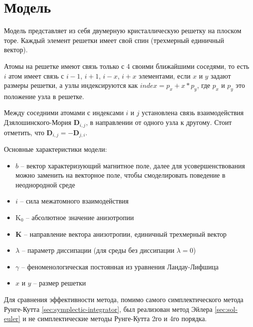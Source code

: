 \section{Модель}\label{sec:model}

Модель представляет из себя двумерную кристаллическую решетку на плоском
торе. Каждый элемент решетки имеет свой спин (трехмерный единичный вектор).

Атомы на решетке имеют связь только с 4 своими ближайшими соседями,
то есть $i$ атом имеет связь с $i-1$, $i+1$, $i-x$, $i+x$ элементами,
если $x$ и $y$ задают размеры решетки, а узлы индексируются как
$index = p_x + x*p_y$, где $p_x$ и $p_y$ это положение
узла в решетке.

Между соседними атомами с индексами $i$ и $j$ установлена связь взаимодействия
Дзялошинского-Мория $\mathbf D_{i,j}$, в направлении от одного узла к другому.
Стоит отметить, что $\mathbf D_{i,j} = -\mathbf D_{j,i}$.

Основные характеристики модели:
\begin{itemize}
\item $b$ -- вектор характеризующий магнитное поле, далее для
    усовершенствования можно заменить на векторное поле, чтобы смоделировать
    поведение в неоднородной среде
\item $i$ -- сила межатомного взаимодействия
\item $\mathrm{K_0}$ -- абсолютное значение анизотропии
\item $\mathbf K$ -- направление вектора анизотропии, единичный трехмерный вектор
\item $\lambda$ -- параметр диссипации (для среды без диссипации $\lambda=0$)
\item $\gamma$ -- феноменологическая постоянная из уравнения Ландау-Лифшица
\item $x$ и $y$ -- размер решетки
\end{itemize}

Для сравнения эффективности метода, помимо самого симплектического метода
Рунге-Кутта \ref{sec:symplectic-integrator}, был реализован метод Эйлера
\ref{sec:sol-euler} и не симплектические методы Рунге-Кутта 2го и 4го порядка.


